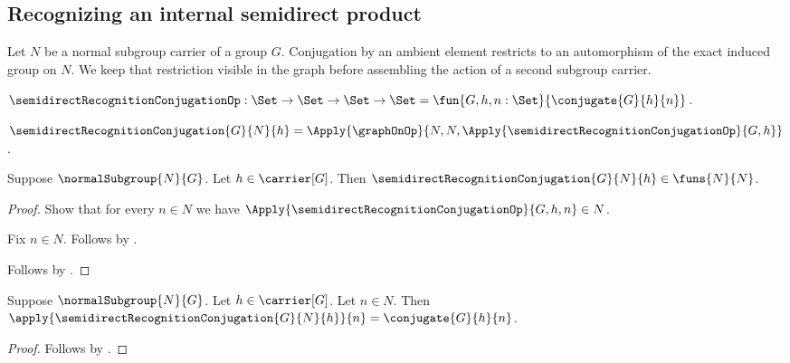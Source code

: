 \subsection{Recognizing an internal semidirect product}

Let $N$ be a normal subgroup carrier of a group $G$.  Conjugation by an
ambient element restricts to an automorphism of the exact induced group on
$N$.  We keep that restriction visible in the graph before assembling the
action of a second subgroup carrier.

\begin{definition}\label{semidirect_recognition_conjugation_op}
    $\semidirectRecognitionConjugationOp:\Set\to\Set\to\Set\to\Set
        =\fun{G,h,n:\Set}{\conjugate{G}{h}{n}}$.
\end{definition}

\begin{definition}\label{semidirect_recognition_conjugation}
    $\semidirectRecognitionConjugation{G}{N}{h}=
        \Apply{\graphOnOp}
            {N,N,\Apply{\semidirectRecognitionConjugationOp}{G,h}}$.
\end{definition}

\begin{proposition}\label{semidirect_recognition_conjugation_type}
    Suppose $\normalSubgroup{N}{G}$.
    Let $h\in\carrier[G]$.
    Then $\semidirectRecognitionConjugation{G}{N}{h}\in\funs{N}{N}$.
\end{proposition}
\begin{proof}
    Show that for every $n\in N$ we have
        $\Apply{\semidirectRecognitionConjugationOp}{G,h,n}\in N$.
    \begin{subproof}
        Fix $n\in N$.
        Follows by
            .
    \end{subproof}
    Follows by
        .
\end{proof}

\begin{proposition}\label{semidirect_recognition_conjugation_apply}
    Suppose $\normalSubgroup{N}{G}$.
    Let $h\in\carrier[G]$.
    Let $n\in N$.
    Then
        $\apply{\semidirectRecognitionConjugation{G}{N}{h}}{n}=
            \conjugate{G}{h}{n}$.
\end{proposition}
\begin{proof}
    Follows by
        .
\end{proof}

